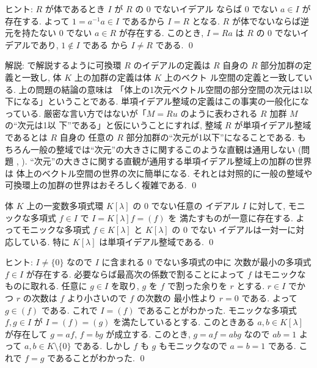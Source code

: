 \documentclass[12pt,twoside]{jarticle}
\begin{document}
\noindent
ヒント: $R$ が体であるとき $I$ が $R$ の $0$ でないイデアル
ならば $0$ でない $a\in I$ が存在する. 
よって $1=a^{-1}a\in I$ であるから $I=R$ となる.  
$R$ が体でないならば逆元を持たない $0$ でない $a\in R$ が存在する.
このとき, $I=Ra$ は $R$ の $0$ でないイデアルであり, $1\not\in I$ である
から $I\ne R$ である.
\qed

\medskip
\noindent
解説: で解説するように可換環 $R$ のイデアルの定義は $R$ 
自身の $R$ 部分加群の定義と一致し, 体 $K$ 上の加群の定義は体 $K$ 上のベクト
ル空間の定義と一致している.  上の問題の結論の意味は
「体上の1次元ベクトル空間の部分空間の次元は1以下になる」ということである.
単項イデアル整域の定義はこの事実の一般化になっている.
厳密な言い方ではないが「$M=Ru$ のように表わされる $R$ 加群 $M$ の``次元は1以
下''である」と仮にいうことにすれば,  
整域 $R$ が単項イデアル整域であるとは $R$ 自身の
任意の $R$ 部分加群の``次元が1以下''になることである.
もちろん一般の整域では``次元''の大きさに関するこのような直観は通用しない
(問題 , ).
``次元''の大きさに関する直観が通用する単項イデアル整域上の加群の世界は
体上のベクトル空間の世界の次に簡単になる.  
それとは対照的に一般の整域や可換環上の加群の世界はおそろしく複雑である.
\qed


\begin{question}
\label{q:K[x]-PID}
  体 $K$ 上の一変数多項式環 $K[\lambda]$ の $0$ でない任意の
  イデアル $I$ に対して, 
  モニックな多項式 $f\in I$ で $I=K[\lambda]f=(f)$ を
  満たすものが一意に存在する. 
  よってモニックな多項式 $f\in K[\lambda]$ と $K[\lambda]$ の $0$ でない
  イデアルは一対一に対応している.
  特に $K[\lambda]$ は単項イデアル整域である.
  \qed
\end{question}

\noindent
ヒント: $I\ne\{0\}$ なので $I$ に含まれる $0$ でない多項式の中に
次数が最小の多項式 $f\in I$ が存在する.  
必要ならば最高次の係数で割ることによって $f$ はモニックなものに取れる.
任意に $g\in I$ を取り, $g$ を $f$ で割った余りを $r$ とする.
$r\in I$ でかつ $r$ の次数は $f$ より小さいので $f$ の次数の
最小性より $r=0$ である.  よって $g\in (f)$ である.
これで $I=(f)$ であることがわかった.
モニックな多項式 $f,g\in I$ が $I=(f)=(g)$ を満たしているとする.
このときある $a,b\in K[\lambda]$ が存在して $g=af$, $f=bg$ が成立する.
このとき, $g=af=abg$ なので $ab=1$ よって $a,b\in K\setminus\{0\}$ である.
しかし $f$ も $g$ もモニックなので $a=b=1$ である.
これで $f=g$ であることがわかった.
\qed
\end{document}
